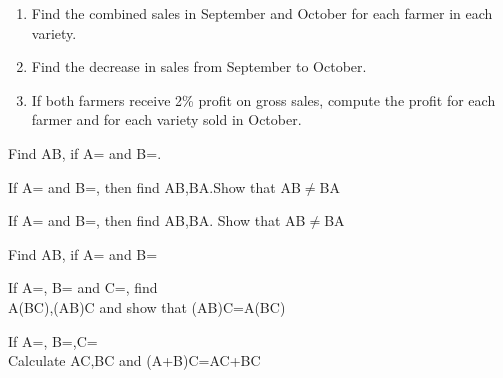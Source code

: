 \begin{enumerate}
    \item Find the combined sales in September and October for each farmer in each variety.
    \item Find the decrease in sales from September to October.
    \item If both farmers receive 2\% profit on gross sales, compute the profit for each farmer and for each variety sold in October.
\end{enumerate}
%
\solution

   
    \item  Find AB, if A= and B=.\\
    \item  If A= and B=, then find AB,BA.Show that AB$\neq$BA

   
     \item If A= and  B=, then find AB,BA. Show that AB$\neq$BA\\
     
   
    \item Find AB, if A= and B=\\
     
   
    \item If A=, B= and C=, find\\A(BC),(AB)C and show that (AB)C=A(BC) \\   
    
     \item If A=, B=,C=\\Calculate AC,BC and (A+B)C=AC+BC\\

